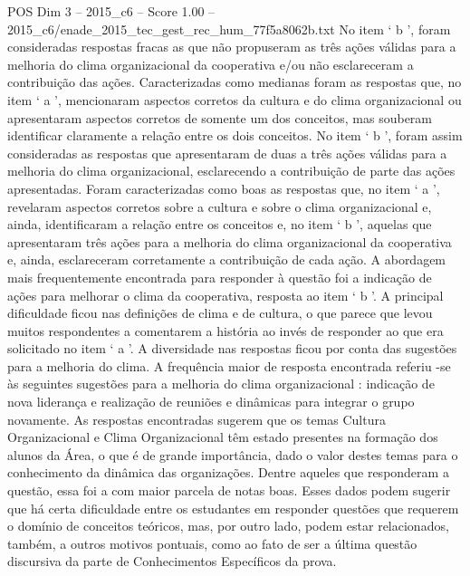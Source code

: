 \begin{textsample}{POS Dim 3 – 2015\_c6 – Score 1.00 – 2015\_c6/enade\_2015\_tec\_gest\_rec\_hum\_77f5a8062b.txt}
No item ‘ b ’, foram consideradas respostas fracas as que não propuseram as três ações válidas para a melhoria do clima organizacional da cooperativa e/ou não esclareceram a contribuição das ações.
Caracterizadas como medianas foram as respostas que, no item ‘ a ’, mencionaram aspectos corretos da cultura e do clima organizacional ou apresentaram aspectos corretos de somente um dos conceitos, mas souberam identificar claramente a relação entre os dois conceitos.
No item ‘ b ’, foram assim consideradas as respostas que apresentaram de duas a três ações válidas para a melhoria do clima organizacional, esclarecendo a contribuição de parte das ações apresentadas.
Foram caracterizadas como boas as respostas que, no item ‘ a ’, revelaram aspectos corretos sobre a cultura e sobre o clima organizacional e, ainda, identificaram a relação entre os conceitos e, no item ‘ b ’, aquelas que apresentaram três ações para a melhoria do clima organizacional da cooperativa e, ainda, esclareceram corretamente a contribuição de cada ação.
A abordagem mais frequentemente encontrada para responder à questão foi a indicação de ações para melhorar o clima da cooperativa, resposta ao item ‘ b ’.
A principal dificuldade ficou nas definições de clima e de cultura, o que parece que levou muitos respondentes a comentarem a história ao invés de responder ao que era solicitado no item ‘ a ’.
A diversidade nas respostas ficou por conta das sugestões para a melhoria do clima.
A frequência maior de resposta encontrada referiu -se às seguintes sugestões para a melhoria do clima organizacional : indicação de nova liderança e realização de reuniões e dinâmicas para integrar o grupo novamente.
As respostas encontradas sugerem que os temas Cultura Organizacional e Clima Organizacional têm estado presentes na formação dos alunos da Área, o que é de grande importância, dado o valor destes temas para o conhecimento da dinâmica das organizações.
Dentre aqueles que responderam a questão, essa foi a com maior parcela de notas boas.
Esses dados podem sugerir que há certa dificuldade entre os estudantes em responder questões que requerem o domínio de conceitos teóricos, mas, por outro lado, podem estar relacionados, também, a outros motivos pontuais, como ao fato de ser a última questão discursiva da parte de Conhecimentos Específicos da prova.

\end{textsample}
